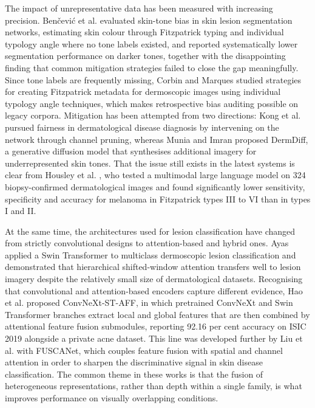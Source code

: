 \documentclass[pdflatex,sn-mathphys-num]{sn-jnl}%
\begin{document}
The impact of unrepresentative data has been measured with increasing precision.
Ben\v{c}evi\'{c} et al. \cite{ref6} evaluated skin-tone bias in skin lesion segmentation
networks, estimating skin colour through Fitzpatrick typing and individual typology angle
where no tone labels existed, and reported systematically lower segmentation performance on
darker tones, together with the disappointing finding that common mitigation strategies
failed to close the gap meaningfully. Since tone labels are frequently missing, Corbin and
Marques \cite{ref7} studied strategies for creating Fitzpatrick metadata for dermoscopic
images using individual typology angle techniques, which makes retrospective bias auditing
possible on legacy corpora. Mitigation has been attempted from two directions: Kong et al.
\cite{ref8} pursued fairness in dermatological disease diagnosis by intervening on the
network through channel pruning, whereas Munia and Imran \cite{ref9} proposed DermDiff, a
generative diffusion model that synthesises additional imagery for underrepresented skin
tones. That the issue still exists in the latest systems is clear from Housley et al.
\cite{ref10}, who tested a multimodal large language model on 324 biopsy-confirmed
dermatological images and found significantly lower sensitivity, specificity and accuracy
for melanoma in Fitzpatrick types III to VI than in types I and II.

At the same time, the architectures used for lesion classification have changed from
strictly convolutional designs to attention-based and hybrid ones. Ayas \cite{ref11} applied
a Swin Transformer to multiclass dermoscopic lesion classification and demonstrated that
hierarchical shifted-window attention transfers well to lesion imagery despite the
relatively small size of dermatological datasets. Recognising that convolutional and
attention-based encoders capture different evidence, Hao et al. \cite{ref12} proposed
ConvNeXt-ST-AFF, in which pretrained ConvNeXt and Swin Transformer branches extract local
and global features that are then combined by attentional feature fusion submodules,
reporting 92.16 per cent accuracy on ISIC 2019 alongside a private acne dataset. This line
was developed further by Liu et al. \cite{ref13} with FUSCANet, which couples feature fusion
with spatial and channel attention in order to sharpen the discriminative signal in skin
disease classification. The common theme in these works is that the fusion of heterogeneous
representations, rather than depth within a single family, is what improves performance on
visually overlapping conditions.
\end{document}
